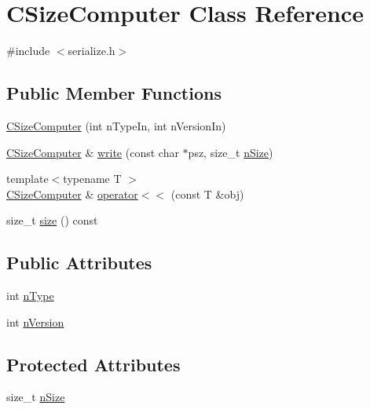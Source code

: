 \hypertarget{class_c_size_computer}{}\section{C\+Size\+Computer Class Reference}
\label{class_c_size_computer}


{\ttfamily \#include $<$serialize.\+h$>$}

\subsection*{Public Member Functions}
\begin{DoxyCompactItemize}
\item 
\mbox{\hyperlink{class_c_size_computer_a475a1a15be285c38c4b94ad0ab0ce73c}{C\+Size\+Computer}} (int n\+Type\+In, int n\+Version\+In)
\item 
\mbox{\hyperlink{class_c_size_computer}{C\+Size\+Computer}} \& \mbox{\hyperlink{class_c_size_computer_ad4b4f5e37acacf894f60c728e694ee89}{write}} (const char $\ast$psz, size\+\_\+t \mbox{\hyperlink{class_c_size_computer_a3ea758bb100dd9ce38071e040cd3c597}{n\+Size}})
\item 
{\footnotesize template$<$typename T $>$ }\\\mbox{\hyperlink{class_c_size_computer}{C\+Size\+Computer}} \& \mbox{\hyperlink{class_c_size_computer_a03a29c76f82dca1559e7922b35bebd0d}{operator$<$$<$}} (const T \&obj)
\item 
size\+\_\+t \mbox{\hyperlink{class_c_size_computer_a649d670bdcfee2b47a1982af566d3d7d}{size}} () const
\end{DoxyCompactItemize}
\subsection*{Public Attributes}
\begin{DoxyCompactItemize}
\item 
int \mbox{\hyperlink{class_c_size_computer_a1f166e95dc06a6f3718b2fac9cda18ee}{n\+Type}}
\item 
int \mbox{\hyperlink{class_c_size_computer_a25759db1089e475fcba2f408633dc7bf}{n\+Version}}
\end{DoxyCompactItemize}
\subsection*{Protected Attributes}
\begin{DoxyCompactItemize}
\item 
size\+\_\+t \mbox{\hyperlink{class_c_size_computer_a3ea758bb100dd9ce38071e040cd3c597}{n\+Size}}
\end{DoxyCompactItemize}


